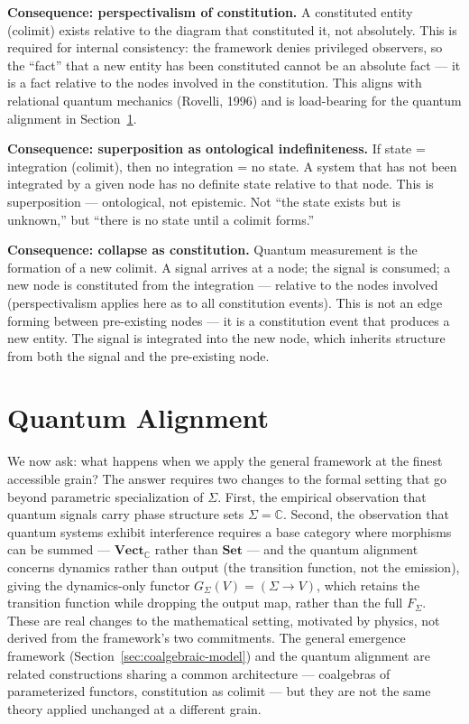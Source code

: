 \documentclass[12pt,a4paper]{article}
\begin{document}
\textbf{Consequence: perspectivalism of constitution.} A constituted entity (colimit) exists relative to the diagram that constituted it, not absolutely. This is required for internal consistency: the framework denies privileged observers, so the ``fact'' that a new entity has been constituted cannot be an absolute fact --- it is a fact relative to the nodes involved in the constitution. This aligns with relational quantum mechanics (Rovelli, 1996) and is load-bearing for the quantum alignment in Section~\ref{sec:quantum-alignment}.

\textbf{Consequence: superposition as ontological indefiniteness.} If state = integration (colimit), then no integration = no state. A system that has not been integrated by a given node has no definite state relative to that node. This is superposition --- ontological, not epistemic. Not ``the state exists but is unknown,'' but ``there is no state until a colimit forms.''

\textbf{Consequence: collapse as constitution.} Quantum measurement is the formation of a new colimit. A signal arrives at a node; the signal is consumed; a new node is constituted from the integration --- relative to the nodes involved (perspectivalism applies here as to all constitution events). This is not an edge forming between pre-existing nodes --- it is a constitution event that produces a new entity. The signal is integrated into the new node, which inherits structure from both the signal and the pre-existing node.

\section{Quantum Alignment}
\label{sec:quantum-alignment}

We now ask: what happens when we apply the general framework at the finest accessible grain? The answer requires two changes to the formal setting that go beyond parametric specialization of $\Sigma$. First, the empirical observation that quantum signals carry phase structure sets $\Sigma = \mathbb{C}$. Second, the observation that quantum systems exhibit interference requires a base category where morphisms can be summed --- $\mathbf{Vect}_{\mathbb{C}}$ rather than $\mathbf{Set}$ --- and the quantum alignment concerns dynamics rather than output (the transition function, not the emission), giving the dynamics-only functor $G_\Sigma(V) = (\Sigma \to V)$, which retains the transition function while dropping the output map, rather than the full $F_\Sigma$. These are real changes to the mathematical setting, motivated by physics, not derived from the framework's two commitments. The general emergence framework (Section~\ref{sec:coalgebraic-model}) and the quantum alignment are related constructions sharing a common architecture --- coalgebras of parameterized functors, constitution as colimit --- but they are not the same theory applied unchanged at a different grain.
\end{document}
